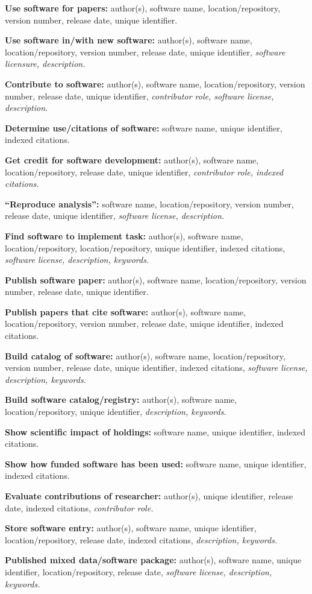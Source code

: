 \documentclass[10pt]{article}
\begin{document}
\begin{guidenumbers}
  \item \textbf{Use software for papers:} author(s), software name, location/repository, version number, release date, unique identifier.
  \item \textbf{Use software in/with new software:} author(s), software name, location/repository, version number, release date, unique identifier, \textit{software licensure, description.}
  \item \textbf{Contribute to software:} author(s), software name, location/repository, version number, release date, unique identifier, \textit{contributor role, software license, description.}
  \item \textbf{Determine use/citations of software:} software name, unique identifier, indexed citations.
  \item \textbf{Get credit for software development:} author(s), software name, location/repository, release date, unique identifier, \textit{contributor role, indexed citations.}
  \item \textbf{“Reproduce analysis”:} software name, location/repository, version number, release date, unique identifier, \textit{software license, description.}
  \item \textbf{Find software to implement task:} author(s), software name, location/repository, location/repository, unique identifier, indexed citations, \textit{software license, description, keywords.}
  \item \textbf{Publish software paper:} author(s), software name, location/repository, version number, release date, unique identifier.
  \item \textbf{Publish papers that cite software:} author(s), software name, location/repository, version number, release date, unique identifier, indexed citations.
  \item \textbf{Build catalog of software:} author(s), software name, location/repository, version number, release date, unique identifier, indexed citations, \textit{software license, description, keywords.}
  \item \textbf{Build software catalog/registry:} author(s), software name, location/repository, unique identifier, \textit{description, keywords.}
  \item \textbf{Show scientific impact of holdings:} software name, unique identifier, indexed citations.
  \item \textbf{Show how funded software has been used:} software name, unique identifier, indexed citations.
  \item \textbf{Evaluate contributions of researcher:} author(s), unique identifier, release date, indexed citations, \textit{contributor role.}
  \item \textbf{Store software entry:} author(s), software name, unique identifier, location/repository, release date, indexed citations, \textit{description, keywords.}
  \item \textbf{Published mixed data/software package:} author(s), software name, unique identifier, location/repository, release date, \textit{software license, description, keywords.}
\end{guidenumbers}
\end{document}
